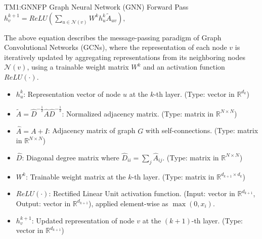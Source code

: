 \documentclass[12pt]{article}
\newcommand{\deftheory}[9][Not Applicable]
{
\newpage
\noindent \rule{\textwidth}{0.5mm}

\paragraph{RefName: } \textbf{#2} \phantomsection 
\label{#2}

\paragraph{Label:} #3

\noindent \rule{\textwidth}{0.5mm}

\paragraph{Equation:}

#4

\paragraph{Description:}

#5

\paragraph{Notes:}

#6

\paragraph{Source:}

#7

\paragraph{Ref.\ By:}

#8

\paragraph{Preconditions for \hyperref[#2]{#2}:}
\label{#2_precond}

#9

\paragraph{Derivation for \hyperref[#2]{#2}:}
\label{#2_deriv}

#1

\noindent \rule{\textwidth}{0.5mm}

}
\begin{document}
\noindent
{}
{TM1:GNNFP}
{Graph Neural Network (GNN) Forward Pass}
{
  $h_v^{k+1} = ReLU \left( \sum_{u \in \mathcal{N}(v)} W^k h_u^k \tilde{A}_{uv} \right),$
}
{The above equation describes the message-passing paradigm of Graph Convolutional Networks (GCNs), where the representation of each node \( v \) is iteratively updated by aggregating representations from its neighboring nodes \( \mathcal{N}(v) \), using a trainable weight matrix \( W^k \) and an activation function \(ReLU(\cdot)\).


\begin{itemize}
    \item \( h_u^k \): Representation vector of node \( u \) at the \( k \)-th layer. (Type: vector in $\mathbb{R}^{d_k}$)
    \item \( \tilde{A} = \hat{D}^{-\frac{1}{2}} \hat{A} \hat{D}^{-\frac{1}{2}} \): Normalized adjacency matrix. (Type: matrix in $\mathbb{R}^{N \times N}$)
    \item \( \hat{A} = A + I \): Adjacency matrix of graph \( G \) with self-connections. (Type: matrix in $\mathbb{R}^{N \times N}$)
    \item \( \hat{D} \): Diagonal degree matrix where \( \hat{D}_{ii} = \sum_j \hat{A}_{ij} \). (Type: matrix in $\mathbb{R}^{N \times N}$)
    \item \( W^k \): Trainable weight matrix at the \( k \)-th layer. (Type: matrix in $\mathbb{R}^{d_{k+1} \times d_k}$)
    \item \(ReLU (\cdot) \): Rectified Linear Unit activation function. (Input: vector in $\mathbb{R}^{d_{k+1}}$, Output: vector in $\mathbb{R}^{d_{k+1}}$), applied element-wise as \( \max(0, x_i) \).
    \item \( h_v^{k+1} \): Updated representation of node \( v \) at the \( (k+1) \)-th layer. (Type: vector in $\mathbb{R}^{d_{k+1}}$)
\end{itemize}
}
\end{document}
